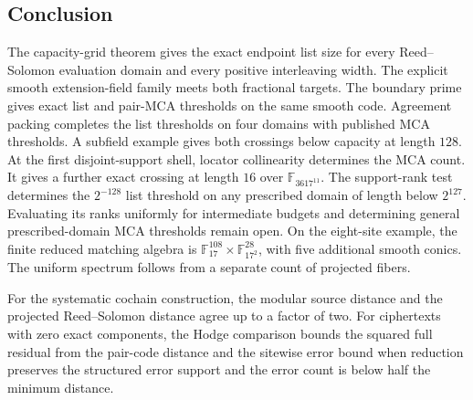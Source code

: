 \begin{samepage}
\section{Conclusion}

The capacity-grid theorem gives the exact endpoint list size for every
Reed--Solomon evaluation domain and every positive interleaving width.
The explicit smooth extension-field family meets both fractional targets.
The boundary prime gives exact list and pair-MCA thresholds on the same
smooth code. Agreement packing completes the list thresholds on four
domains with published MCA thresholds. A subfield example gives both
crossings below capacity at length \(128\). At the first disjoint-support
shell, locator collinearity determines the MCA count. It gives a further
exact crossing at length \(16\) over \(\mathbb F_{3617^{11}}\).
The support-rank test determines
the \(2^{-128}\) list threshold on any prescribed domain of length below
\(2^{127}\). Evaluating its ranks
uniformly for intermediate budgets and determining general prescribed-domain
MCA thresholds remain open. On the eight-site example, the finite reduced
matching algebra is \(\mathbb F_{17}^{108}\times\mathbb F_{17^2}^{28}\), with
five additional smooth conics. The uniform spectrum follows from a separate
count of projected fibers.

For the systematic cochain construction, the modular source distance and
the projected Reed--Solomon distance agree up to a factor of two. For
ciphertexts with zero exact components, the Hodge comparison bounds the
squared full residual from the pair-code distance and the sitewise error
bound when reduction preserves the structured error support and the error
count is below half the minimum distance.
\end{samepage}
